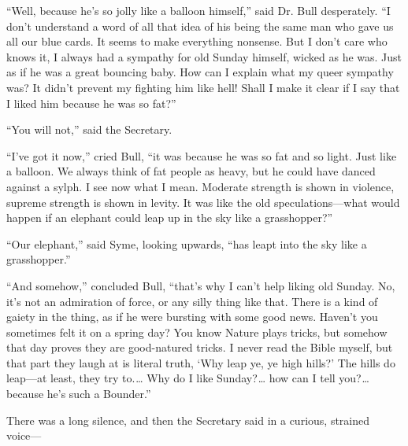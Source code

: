 “Well, because he’s so jolly like a balloon himself,” said Dr. Bull desperately. “I don’t understand a word of all that idea of his being the same man who gave us all our blue cards. It seems to make everything nonsense. But I don’t care who knows it, I always had a sympathy for old Sunday himself, wicked as he was. Just as if he was a great bouncing baby. How can I explain what my queer sympathy was? It didn’t prevent my fighting him like hell! Shall I make it clear if I say that I liked him because he was so fat?”

“You will not,” said the Secretary.

“I’ve got it now,” cried Bull, “it was because he was so fat and so light. Just like a balloon. We always think of fat people as heavy, but he could have danced against a sylph. I see now what I mean. Moderate strength is shown in violence, supreme strength is shown in levity. It was like the old speculations⁠—what would happen if an elephant could leap up in the sky like a grasshopper?”

“Our elephant,” said Syme, looking upwards, “has leapt into the sky like a grasshopper.”

“And somehow,” concluded Bull, “that’s why I can’t help liking old Sunday. No, it’s not an admiration of force, or any silly thing like that. There is a kind of gaiety in the thing, as if he were bursting with some good news. Haven’t you sometimes felt it on a spring day? You know Nature plays tricks, but somehow that day proves they are good-natured tricks. I never read the Bible myself, but that part they laugh at is literal truth, ‘Why leap ye, ye high hills?’ The hills do leap⁠—at least, they try to.⁠ ⁠… Why do I like Sunday?⁠ ⁠… how can I tell you?⁠ ⁠… because he’s such a Bounder.”

There was a long silence, and then the Secretary said in a curious, strained voice⁠—

